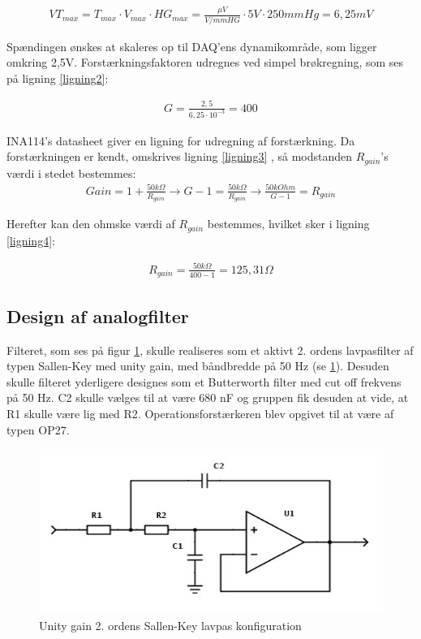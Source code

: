 \begin{align}
	VT_{max}=T_{max}\cdot V_{max}\cdot HG_{max}=\frac{\mu V}{V/mmHG}\cdot 5V\cdot 250mmHg=6,25mV
	\label{ligning1}
\end{align}

Spændingen ønskes at skaleres op til DAQ’ens dynamikområde, som ligger omkring 2,5V. Forstærkningsfaktoren udregnes ved simpel brøkregning, som ses på ligning \ref{ligning2}:

\begin{center}
	\begin{align}
		G=\frac{2,5}{6,25 \cdot 10^{-3}}=400
		\label{ligning2}
	\end{align}
\end{center}

INA114’s datasheet giver en ligning for udregning af forstærkning. Da forstærkningen er kendt, omskrives ligning \ref{ligning3} , så modstanden $R_{gain}$’s værdi i stedet bestemmes:\\


\begin{align}
	Gain=1+\frac{50k\Omega}{R_{gain}}\to G-1=\frac{50k\Omega}{R_{gain}}\to \frac{50kOhm}{G-1}=R_{gain}
	\label{ligning3}
\end{align}

Herefter kan den ohmske værdi af $R_{gain}$ bestemmes, hvilket sker i ligning \ref{ligning4}:

\begin{align}
	R_{gain}=\frac{50k\Omega}{400-1}=125,31 \Omega
	\label{ligning4}
\end{align}

\subsection{Design af analogfilter}
Filteret, som ses på figur \ref{fig:Filter}, skulle realiseres som et aktivt 2. ordens lavpasfilter af typen Sallen-Key med unity gain, med båndbredde på 50 Hz (se \ref{fig:Filter}). Desuden skulle filteret yderligere designes som et Butterworth filter med cut off frekvens på 50 Hz. C2 skulle vælges til at være 680 nF og gruppen fik desuden at vide, at R1 skulle være lig med R2. Operationsforstærkeren blev opgivet til at være af typen OP27.  

\begin{figure}[H]
	\centering
	\includegraphics[width=1\textwidth]{Figurer/Hardware/FilterDesign}
	\caption{Unity gain 2. ordens Sallen-Key lavpas konfiguration}
	\label{fig:Filter}
\end{figure}

